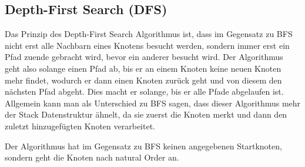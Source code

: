 \documentclass[
../../AuD-Zusammenfassung.tex,
]
{subfiles}
\begin{document}
\subsection{Depth-First Search (DFS)}
Das Prinzip des Depth-First Search Algorithmus ist, dass im Gegensatz zu BFS nicht erst alle Nachbarn eines Knotens besucht werden, sondern immer erst ein Pfad zuende gebracht wird, bevor ein anderer besucht wird. Der Algorithmus geht also solange einen Pfad ab, bis er an einem Knoten keine neuen Knoten mehr findet, wodurch er dann einen Knoten zurück geht und von diesem den nächsten Pfad abgeht. Dies macht er solange, bis er alle Pfade abgelaufen ist.\\ Allgemein kann man als Unterschied zu BFS sagen, dass dieser Algorithmus mehr der Stack Datenstruktur ähnelt, da sie zuerst die Knoten merkt und dann den zuletzt hinzugefügten Knoten verarbeitet.\\
\begin{algorithm}[H]

\end{algorithm}
Der Algorithmus hat im Gegensatz zu BFS keinen angegebenen Startknoten, sondern geht die Knoten nach natural Order an. 
\newpage
\end{document}
